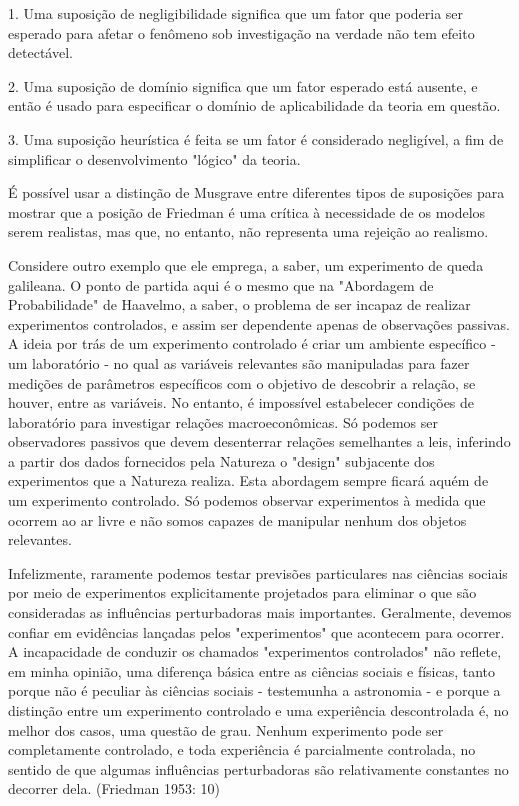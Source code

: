 \documentclass[12pt]{article}
\begin{document}
1. Uma suposição de negligibilidade significa que um fator que poderia ser esperado
para afetar o fenômeno sob investigação na verdade não tem efeito detectável.

2. Uma suposição de domínio significa que um fator esperado está ausente, e então
é usado para especificar o domínio de aplicabilidade da teoria em questão.

3. Uma suposição heurística é feita se um fator é considerado negligível,
a fim de simplificar o desenvolvimento "lógico" da teoria.

É possível usar a distinção de Musgrave entre diferentes tipos de suposições para mostrar que a posição de Friedman é uma crítica à necessidade de os modelos serem realistas, mas que, no entanto, não representa uma rejeição ao realismo.

Considere outro exemplo que ele emprega, a saber, um experimento de queda galileana. O ponto de partida aqui é o mesmo que na "Abordagem de Probabilidade" de Haavelmo, a saber, o problema de ser incapaz de realizar experimentos controlados, e assim ser dependente apenas de observações passivas. A ideia por trás de um experimento controlado é criar um ambiente específico - um laboratório - no qual as variáveis relevantes são manipuladas para fazer medições de parâmetros específicos com o objetivo de descobrir a relação, se houver, entre as variáveis. No entanto, é impossível estabelecer condições de laboratório para investigar relações macroeconômicas. Só podemos ser observadores passivos que devem desenterrar relações semelhantes a leis, inferindo a partir dos dados fornecidos pela Natureza o "design" subjacente dos experimentos que a Natureza realiza. Esta abordagem sempre ficará aquém de um experimento controlado. Só podemos observar experimentos à medida que ocorrem ao ar livre e não somos capazes de manipular nenhum dos objetos relevantes.

Infelizmente, raramente podemos testar previsões particulares nas ciências sociais por meio de experimentos explicitamente projetados para eliminar o que são consideradas as influências perturbadoras mais importantes. Geralmente, devemos confiar em evidências lançadas pelos "experimentos" que acontecem para ocorrer. A incapacidade de conduzir os chamados "experimentos controlados" não reflete, em minha opinião, uma diferença básica entre as ciências sociais e físicas, tanto porque não é peculiar às ciências sociais - testemunha a astronomia - e porque a distinção entre um experimento controlado e uma experiência descontrolada é, no melhor dos casos, uma questão de grau. Nenhum experimento pode ser completamente controlado, e toda experiência é parcialmente controlada, no sentido de que algumas influências perturbadoras são relativamente constantes no decorrer dela.
(Friedman 1953: 10)
\end{document}
